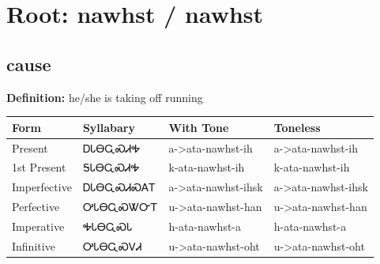 \documentclass{article}%
\begin{document}
%
\normalsize%
\section*{Root: nawhst / nawhst}%
\subsection*{cause}%
\textbf{Definition: }%
he/she is taking off running%
\\[0.5em]%
\begin{tabular}{|l|l|l|l|}%
\hline%
\textbf{Form}&\textbf{Syllabary}&\textbf{With Tone}&\textbf{Toneless}\\%
\hline%
Present&ᎠᏓᎾᏩᏍᏗᎭ&a{-}>ata{-}nawhst{-}ih&a{-}>ata{-}nawhst{-}ih\\%
1st Present&ᎦᏓᎾᏩᏍᏗᎭ&k{-}ata{-}nawhst{-}ih&k{-}ata{-}nawhst{-}ih\\%
Imperfective&ᎠᏓᎾᏩᏍᏗᏍᎪᎢ&a{-}>ata{-}nawhst{-}ihsk&a{-}>ata{-}nawhst{-}ihsk\\%
Perfective&ᎤᏓᎾᏩᏍᏔᏅᎢ&u{-}>ata{-}nawhst{-}han&u{-}>ata{-}nawhst{-}han\\%
Imperative&ᎭᏓᎾᏩᏍᏓ&h{-}ata{-}nawhst{-}a&h{-}ata{-}nawhst{-}a\\%
Infinitive&ᎤᏓᎾᏩᏍᏙᏗ&u{-}>ata{-}nawhst{-}oht&u{-}>ata{-}nawhst{-}oht\\%
\hline%
\end{tabular}%
\\[1em]%
\end{document}
